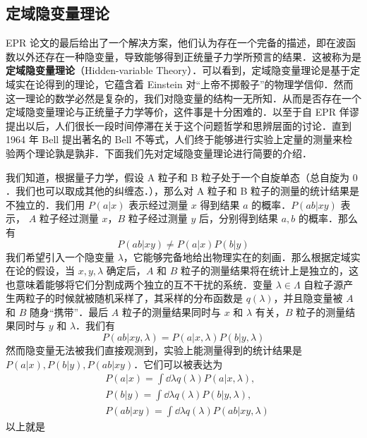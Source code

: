 \subsection{定域隐变量理论}
EPR 论文的最后给出了一个解决方案，他们认为存在一个完备的描述，即在波函数以外还存在一种隐变量，导致能够得到正统量子力学所预言的结果．这被称为是\textbf{定域隐变量理论}（Hidden-variable Theory）．可以看到，定域隐变量理论是基于定域实在论得到的理论，它蕴含着 Einstein 对“上帝不掷骰子”的物理学信仰．然而这一理论的数学必然是复杂的，我们对隐变量的结构一无所知．从而是否存在一个定域隐变量理论与正统量子力学等价，这件事是十分困难的．以至于自 EPR 佯谬提出以后，人们很长一段时间停滞在关于这个问题哲学和思辨层面的讨论．直到 1964 年 Bell 提出著名的 Bell 不等式，人们终于能够进行实验上定量的测量来检验两个理论孰是孰非．下面我们先对定域隐变量理论进行简要的介绍．

我们知道，根据量子力学，假设 A 粒子和 B 粒子处于一个自旋单态（总自旋为 $0$．我们也可以取成其他的纠缠态．），那么对 A 粒子和 B 粒子的测量的统计结果是不独立的．我们用 $P(a | x)$ 表示经过测量 $x$ 得到结果 $a$ 的概率．$P(ab | xy)$ 表示， $A$ 粒子经过测量 $x$，$B$ 粒子经过测量 $y$ 后，分别得到结果 $a,b$ 的概率．那么有
\begin{equation}
P(ab|xy)\neq P(a|x)P(b|y)
\end{equation}
我们希望引入一个隐变量 $\lambda$，它能够完备地给出物理实在的刻画．那么根据定域实在论的假设，当 $x,y,\lambda$ 确定后，$A$ 和 $B$ 粒子的测量结果将在统计上是独立的，这也意味着能够将它们分割成两个独立的互不干扰的系统．变量 $\lambda\in \Lambda$ 自粒子源产生两粒子的时候就被随机采样了，其采样的分布函数是 $q(\lambda)$，并且隐变量被 $A$ 和 $B$ 随身“携带”．最后 $A$ 粒子的测量结果同时与 $x$ 和 $\lambda$ 有关，$B$ 粒子的测量结果同时与 $y$ 和 $\lambda$．我们有
\begin{equation}
P(ab|xy,\lambda)=P(a|x,\lambda)P(b|y,\lambda)
\end{equation}
然而隐变量无法被我们直接观测到，实验上能测量得到的统计结果是 $P(a|x),P(b|y),P(ab|xy)$．它们可以被表达为
\begin{equation}
\begin{aligned}
&P(a|x)=\int \dd \lambda q(\lambda)P(a|x,\lambda),\\
&P(b|y)=\int \dd \lambda q(\lambda)P(b|y,\lambda),\\
&P(ab|xy)=\int \dd \lambda q(\lambda)P(ab|xy,\lambda)
\end{aligned}
\end{equation}
以上就是